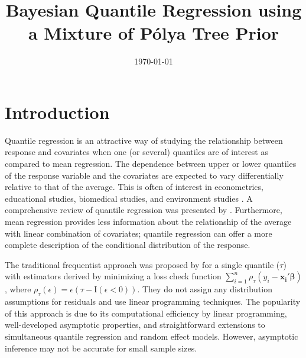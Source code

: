 \documentclass[12pt]{article}
\title{Bayesian Quantile Regression using a  Mixture of P\'{o}lya Tree Prior}
\date{\today}
\author{}
\begin{document}

\maketitle{}

\section{Introduction}

Quantile regression is an attractive way of studying the relationship
between response and covariates when one (or several) quantiles are of
interest as compared to mean regression.  The dependence between upper
or lower quantiles of the response variable and the covariates are
expected to vary differentially relative to that of the average. This
is often of interest in econometrics, educational studies, biomedical
studies, and environment studies \citep{yu2001,buchinsky1994,
  buchinsky1998,he1998,koenker1999, wei2006, yu2003}.  A comprehensive
review of quantile regression was presented by \citet{koenker2005}.
Furthermore, mean regression provides less information about the
relationship of the average with linear combination of covariates;
quantile regression can offer a more complete description of the
conditional distribution of the response.

The traditional frequentist approach was proposed by
\citet{koenker1978} for a single quantile ($\tau$) with estimators
derived by minimizing a loss check function $\sum_{i=1}^n
\rho_{\tau}(y_i - \bm{x_i'\beta})$, where $\rho_{\tau}(\epsilon) =
\epsilon (\tau- \mathrm{I}(\epsilon < 0))$. They do not assign any
distribution assumptions for residuals and use linear programming
techniques.  The popularity of this approach is due to its
computational efficiency by linear programming, well-developed
asymptotic properties, and straightforward extensions to simultaneous
quantile regression and random effect models. However, asymptotic
inference may not be accurate for small sample sizes.
\end{document}
